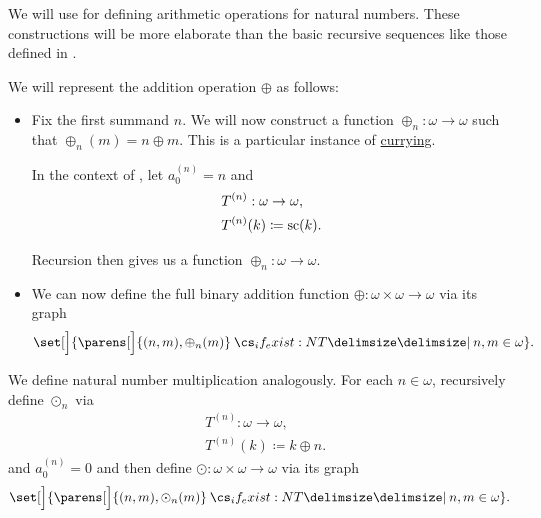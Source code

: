 \begin{definition}\label{def:omega_operations}\mimprovised
  We will use  for defining arithmetic operations for natural numbers. These constructions will be more elaborate than the basic recursive sequences like those defined in .

  \begin{thmenum}
     We will represent the addition operation \( \oplus \) as follows:

    \begin{itemize}
      \item Fix the first summand \( n \). We will now construct a function \( \oplus_n: \omega \to \omega \) such that \( \oplus_n(m) = n \oplus m \). This is a particular instance of \hyperref[def:function_currying]{currying}.

      In the context of , let \( a_0^{(n)} = n \) and
      \begin{equation*}
        \begin{aligned}
          &T^{(n)}: \omega \to \omega, \\
          &T^{(n)}(k) \coloneqq \op{sc}(k).
        \end{aligned}
      \end{equation*}

      Recursion then gives us a function \( \oplus_n: \omega \to \omega \).

      \item We can now define the full binary addition function \( \oplus: \omega \times \omega \to \omega \) via its graph
      \begin{equation*}
        \set[\Big]{ \parens[\Big]{ (n, m), \oplus_n(m) } \given* n, m \in \omega }.
      \end{equation*}
    \end{itemize}

     We define natural number multiplication analogously. For each \( n \in \omega \), recursively define \( \odot_n \) via
    \begin{equation*}
      \begin{aligned}
        &T^{(n)}: \omega \to \omega, \\
        &T^{(n)}(k) \coloneqq k \oplus n.
      \end{aligned}
    \end{equation*}
    and \( a_0^{(n)} = 0 \) and then define \( \odot: \omega \times \omega \to \omega \) via its graph
    \begin{equation*}
      \set[\Big]{ \parens[\Big]{ (n, m), \odot_n(m) } \given* n, m \in \omega }.
    \end{equation*}
  \end{thmenum}
\end{definition}

